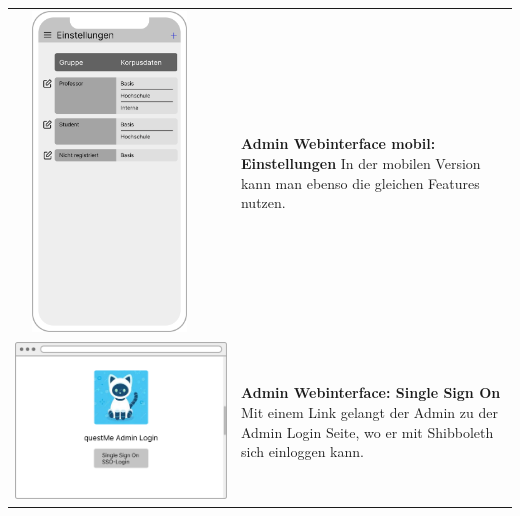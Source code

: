 \begin{tabular}{C{6cm}  L{7cm}}
    \includegraphics[width=5cm,height=8.5cm]{bilder/new vers. UI Design/Einstellungen/iPhone X Einstellungen I (1).png} & \textbf{Admin Webinterface mobil: Einstellungen} \newline
    In der mobilen Version kann man ebenso die gleichen Features nutzen.                                                                                                             \\
    \includegraphics[width=\linewidth]{bilder/new vers. UI Design/Login SSO/Admin Interface SSO.png}                    & \textbf{Admin Webinterface: Single Sign On} \newline
    Mit einem Link gelangt der Admin zu der Admin Login Seite, wo er mit Shibboleth sich einloggen kann.                                                                             \\

\end{tabular}
